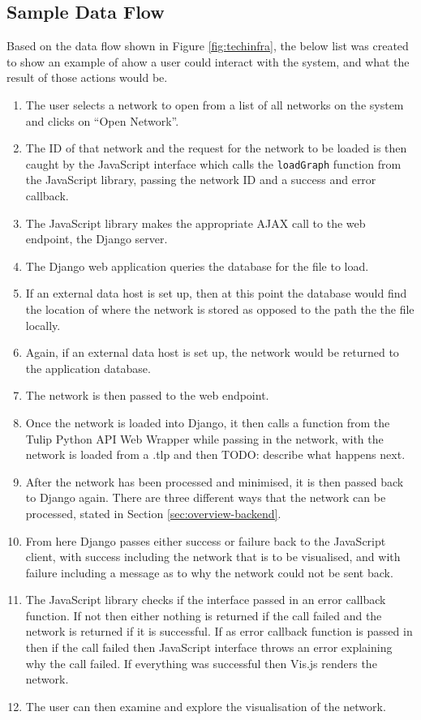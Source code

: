 \documentclass[../dissertation.tex]{subfiles}
\begin{document}
\subsection{Sample Data Flow}

Based on the data flow shown in Figure \ref{fig:techinfra}, the below list was created to show an example of ahow a user could interact with the system, and what the result of those actions would be.

\begin{enumerate}
    \item The user selects a network to open from a list of all networks on the system and clicks on ``Open Network''.
    \item The ID of that network and the request for the network to be loaded is then caught by the JavaScript interface which calls the \texttt{loadGraph} function from the JavaScript library, passing the network ID and a success and error callback.
    \item The JavaScript library makes the appropriate AJAX call to the web endpoint, the Django server.
    \item The Django web application queries the database for the file to load.
    \item If an external data host is set up, then at this point the database would find the location of where the network is stored as opposed to the path the the file locally.
    \item Again, if an external data host is set up, the network would be returned to the application database.
    \item The network is then passed to the web endpoint.
    \item Once the network is loaded into Django, it then calls a function from the Tulip Python API Web Wrapper while passing in the network, with the network is loaded from a .tlp and then TODO: describe what happens next.
    \item After the network has been processed and minimised, it is then passed back to Django again. There are three different ways that the network can be processed, stated in Section \ref{sec:overview-backend}.
    \item From here Django passes either success or failure back to the JavaScript client, with success including the network that is to be visualised, and with failure including a message as to why the network could not be sent back.
    \item The JavaScript library checks if the interface passed in an error callback function. If not then either nothing is returned if the call failed and the network is returned if it is successful. If as error callback function is passed in then if the call failed then JavaScript interface throws an error explaining why the call failed. If everything was successful then Vis.js renders the network.
    \item The user can then examine and explore the visualisation of the network.
\end{enumerate}
\end{document}
